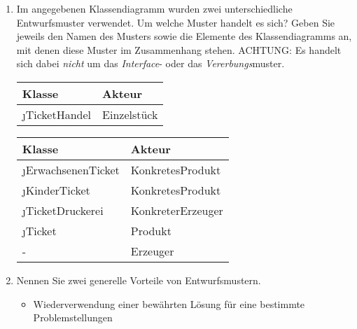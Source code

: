 \documentclass{lehramt-informatik-aufgabe}
\begin{document}
\begin{enumerate}


\item Im angegebenen Klassendiagramm wurden zwei unterschiedliche
Entwurfsmuster verwendet. Um welche Muster handelt es sich? Geben Sie
jeweils den Namen des Musters sowie die Elemente des Klassendiagramms
an, mit denen diese Muster im Zusammenhang stehen. ACHTUNG: Es handelt
sich dabei \emph{nicht} um das \emph{Interface}- oder das
\emph{Vererbungs}muster.

\begin{liAntwort}

\liEntwurfsEinzelstueckUml
\liEntwurfsEinzelstueckAkteure

\begin{tabular}{l|l}
\textbf{Klasse}       & \textbf{Akteur} \\\hline\hline
\j{TicketHandel}      & Einzelstück\\
\end{tabular}


\liEntwurfsFabrikmethodeUml
\liEntwurfsFabrikmethodeAkteure

\begin{tabular}{l|l}
\textbf{Klasse}       & \textbf{Akteur} \\\hline\hline
\j{ErwachsenenTicket} & KonkretesProdukt\\
\j{KinderTicket}      & KonkretesProdukt\\
\j{TicketDruckerei}   & KonkreterErzeuger\\
\j{Ticket}            & Produkt\\
-                     & Erzeuger\\
\end{tabular}
\end{liAntwort}


\item Nennen Sie zwei generelle Vorteile von Entwurfsmustern.

\begin{liAntwort}
\begin{itemize}
\item Wiederverwendung einer bewährten Lösung für eine bestimmte
Problemstellungen


\end{itemize}
\end{liAntwort}
\end{enumerate}
\end{document}

